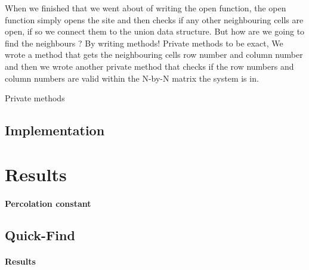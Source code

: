 \documentclass[11pt,a4paper,notitlepage]{article}
\newcommand{\explanation}[1]{}  %
\begin{document}
    When we finished that we went about of writing the open function, the open function simply opens the site and then checks if any other neighbouring cells are open, if so we connect them to the union data structure. But how are we going to find the neighbours ?
    By writing methods! Private methods to be exact, We wrote a method that gets the neighbouring cells row number and column number and then we wrote another private method that checks if the row numbers and column numbers are valid within the N-by-N matrix the system is in. 
    
    Private methods 






\subsection{Implementation}
\explanation{Describe how you implemented the \texttt{Percolation} datatype. How did you check
whether the system percolates?}


\explanation{Describe how you implemented \texttt{PercolationStats}.}

\section{Results}
\explanation{Describe the experimental results in words, referring to the tables.}

\paragraph{Percolation constant}
\explanation{What estimate of the percolation constant did your experiments suggest?}

\subsection{Quick-Find}

\explanation{Using Percolation with \texttt{QuickFindUF.java}, fill in the table below such that the $N$ values are
  multiples of each other.  Also fill in the second table, using a fixed, relevant value of $N$.}

\paragraph{Results}
\end{document}
